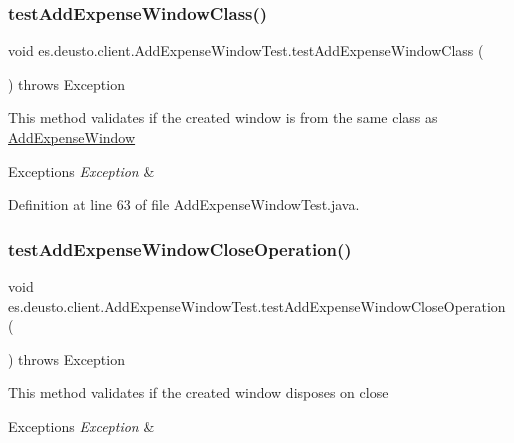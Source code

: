 \subsubsection{\texorpdfstring{test\+Add\+Expense\+Window\+Class()}{testAddExpenseWindowClass()}}
{\footnotesize\ttfamily void es.\+deusto.\+client.\+Add\+Expense\+Window\+Test.\+test\+Add\+Expense\+Window\+Class (\begin{DoxyParamCaption}{ }\end{DoxyParamCaption}) throws Exception}

This method validates if the created window is from the same class as \hyperlink{classes_1_1deusto_1_1client_1_1_add_expense_window}{Add\+Expense\+Window}


\begin{DoxyExceptions}{Exceptions}
{\em Exception} & \\
\hline
\end{DoxyExceptions}


Definition at line 63 of file Add\+Expense\+Window\+Test.\+java.

\mbox{\label{classes_1_1deusto_1_1client_1_1_add_expense_window_test_abf270b5711e0c1fd74e7818e96487c46}} 
\subsubsection{\texorpdfstring{test\+Add\+Expense\+Window\+Close\+Operation()}{testAddExpenseWindowCloseOperation()}}
{\footnotesize\ttfamily void es.\+deusto.\+client.\+Add\+Expense\+Window\+Test.\+test\+Add\+Expense\+Window\+Close\+Operation (\begin{DoxyParamCaption}{ }\end{DoxyParamCaption}) throws Exception}

This method validates if the created window disposes on close


\begin{DoxyExceptions}{Exceptions}
{\em Exception} & \\
\hline
\end{DoxyExceptions}


